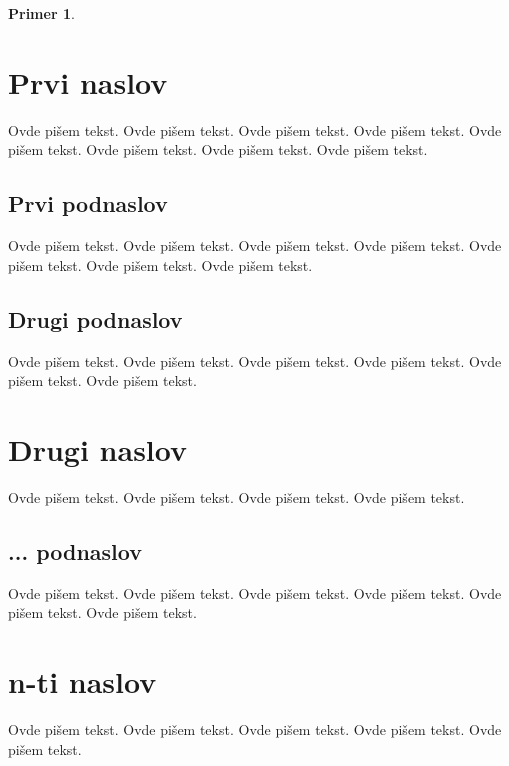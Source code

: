 \documentclass[a4paper]{article}
\newtheorem{primer}{Primer}[section]
\begin{document}
{\begin{primer}
\end{primer}





\section{Prvi naslov}
\label{sec:naslov1}


Ovde pišem tekst. 
Ovde pišem tekst. 
Ovde pišem tekst. 
Ovde pišem tekst. 
Ovde pišem tekst. 
Ovde pišem tekst. 
Ovde pišem tekst. 
Ovde pišem tekst. 


\subsection{Prvi podnaslov}
\label{subsec:podnaslov1}

Ovde pišem tekst. 
Ovde pišem tekst. 
Ovde pišem tekst. 
Ovde pišem tekst. 
Ovde pišem tekst. 
Ovde pišem tekst. 
Ovde pišem tekst. 

\subsection{Drugi podnaslov}
\label{subsec:podnaslov2}

Ovde pišem tekst. 
Ovde pišem tekst. 
Ovde pišem tekst. 
Ovde pišem tekst. 
Ovde pišem tekst. 
Ovde pišem tekst. 

\section{Drugi naslov}
\label{sec:naslov2}

Ovde pišem tekst. 
Ovde pišem tekst. 
Ovde pišem tekst. 
Ovde pišem tekst. 

\subsection{... podnaslov}
\label{subsec:podnaslovN}

Ovde pišem tekst. 
Ovde pišem tekst. 
Ovde pišem tekst. 
Ovde pišem tekst. 
Ovde pišem tekst. 
Ovde pišem tekst. 

\section{n-ti naslov}
\label{sec:naslovN}

Ovde pišem tekst. 
Ovde pišem tekst. 
Ovde pišem tekst. 
Ovde pišem tekst. 
Ovde pišem tekst. 

}
\end{document}
